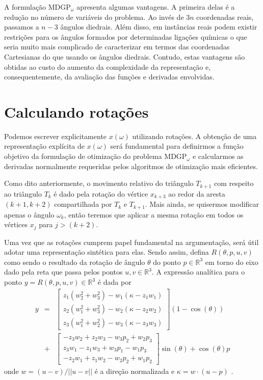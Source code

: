 \documentclass[10pt,a4paper]{article}
\newcommand{\R}{\mathbb{R}}
\begin{document}
A formulação MDGP$_\omega$ apresenta algumas vantagens. A primeira delas é a redução no número de variáveis do problema. Ao invés de $3n$ coordenadas reais, passamos a $n-3$ ângulos diedrais. Além disso, em instâncias reais podem existir restrições para os ângulos formados por determinadas ligações químicas o que seria muito mais complicado de caracterizar em termos das coordenadas Cartesianas do que usando os ângulos diedrais. Contudo, estas vantagens são obtidas ao custo do aumento da complexidade da representação e, consequentemente, da avaliação das funções e derivadas envolvidas.

\section{Calculando rotações}\label{sec:rot}
Podemos escrever explicitamente $x(\omega)$ utilizando rotações. A obtenção de uma representação explícita de $x(\omega)$ será fundamental para definirmos a função objetivo da formulação de otimização do problema MDGP$_\omega$ e calcularmos as derivadas normalmente requeridas pelos algoritmos de otimização mais eficientes. 

Como dito anteriormente, o movimento relativo do triângulo $T_{k+1}$ com respeito ao triângulo $T_{k}$ é dado pela rotação do vértice $x_{k+3}$ ao redor da aresta $(k+1,k+2)$ compartilhada por $T_k$ e $T_{k+1}$. Mais ainda, se quisermos modificar apenas o ângulo $\omega_k$, então teremos que aplicar a mesma rotação em todos os vértices $x_j$ para $j>(k+2)$. 

Uma vez que as rotações cumprem papel fundamental na argumentação, será útil adotar uma representação sintética para elas. Sendo assim, defina $R(\theta,p,u,v)$ como sendo o resultado da rotação de ângulo $\theta$ do ponto $p\in\R^3$ em torno do eixo dado pela reta que passa pelos pontos $u,v\in\R^3$. A expressão analítica para o ponto $y=R(\theta,p,u,v)\in\R^3$ é dada por
\begin{eqnarray}\label{eq:rot_y}
\nonumber y&=&
\left[
\begin{array}{c}
z_1(w_2^2+w_3^2)-w_1(\kappa-z_1w_1)\\
z_2(w_1^2+w_3^2)-w_2(\kappa-z_2w_2)\\
z_3(w_1^2+w_2^2)-w_3(\kappa-z_3w_3)
\end{array}
\right](1-\cos(\theta)) \\
&+&
\left[
\begin{array}{c}
-z_3w_2+z_2w_3-w_3p_2+w_2p_3\\
 z_3w_1-z_1w_3+w_3p_1-w_1p_3\\
-z_2w_1+z_1w_2-w_2p_2+w_1p_2
\end{array}
\right] \sin(\theta) + \cos(\theta)p
\end{eqnarray}
onde $w=(u-v)/||u-v||$ é a direção normalizada e $\kappa=w\cdot(u-p)$ \cite{Murray2013}.
\end{document}
